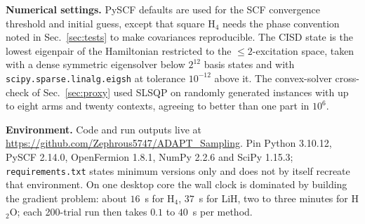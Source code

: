 \documentclass[10pt]{article}
\begin{document}
\textbf{Numerical settings.} PySCF defaults are used for the SCF convergence
threshold and initial guess, except that square H$_4$ needs the phase convention
noted in Sec.~\ref{sec:tests} to make covariances reproducible. The CISD state is
the lowest eigenpair of the Hamiltonian restricted to the $\le2$-excitation space,
taken with a dense symmetric eigensolver below $2^{12}$ basis states and with
\texttt{scipy.sparse.linalg.eigsh} at tolerance $10^{-12}$ above it. The
convex-solver cross-check of Sec.~\ref{sec:proxy} used SLSQP on randomly generated
instances with up to eight arms and twenty contexts, agreeing to better than one
part in $10^{6}$.

\textbf{Environment.} Code and run outputs live at
\url{https://github.com/Zephrous5747/ADAPT_Sampling}. Pin Python 3.10.12,
PySCF 2.14.0, OpenFermion 1.8.1, NumPy 2.2.6 and SciPy 1.15.3;
\texttt{requirements.txt} states minimum versions only and does not by itself
recreate that environment. On one desktop core the wall clock is dominated by
building the gradient problem: about $16$~s for H$_4$, $37$~s for LiH, two to
three minutes for H$_2$O; each 200-trial run then takes $0.1$ to $40$~s per
method.
\end{document}
